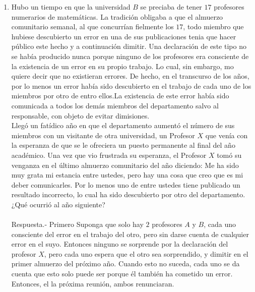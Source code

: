 \begin{enumerate}
       \item Hubo un tiempo en que la universidad $B$ se preciaba de tener $17$ profesores numerarios de matemáticas. La tradición obligaba a que el almuerzo comunitario semanal, al que concurrían fielmente los $17$, todo miembro que hubiese descubierto un error en una de sus publicaciones tenia que hacer público este hecho y a continuación dimitir. Una declaración de este tipo no se había producido nunca porque ninguno de los profesores era consciente de la existencia de un error en su propio trabajo. Lo cual, sin embargo, mo quiere decir que no existieran errores. De hecho, en el transcurso de los años, por lo menos un error había sido descubierto en el trabajo de cada uno de los miembros por otro de entro ellos.La existencia de este error había sido comunicada a todos los demás miembros del departamento salvo al responsable, con objeto de evitar dimisiones.\\
          Llegó un fatídico año en que el departamento aumentó el número de sus miembros con un visitante de otra universidad, un Profesor $X$ que venía con la esperanza de que se le ofreciera un puesto permanente al final del año académico. Una vez que vio frustrada su esperanza, el Profesor $X$ tomó su venganza en el último almuerzo comunitario del año diciendo: Me ha sido muy grata mi estancia entre ustedes, pero hay una cosa que creo que es mi deber comunicarles. Por lo menos uno de entre ustedes tiene publicado un resultado incorrecto, lo cual ha sido descubierto por otro del departamento. ¿Qué ocurrió al año siguiente?\\\\
          Respuesta.-\; Primero Suponga que solo hay $2$ profesores $A$ y $B$, cada uno consciente del error en el trabajo del otro, pero sin darse cuenta de cualquier error en el suyo. Entonces ninguno se sorprende por la declaración del profesor $X$, pero cada uno espera que el otro sea sorprendido, y dimitir en el primer almuerzo del próximo año. Cuando esto no suceda, cada uno se da cuenta que esto solo puede ser porque él también ha cometido un error. Entonces, el la próxima reunión, ambos renunciaran.\\

\end{enumerate}
